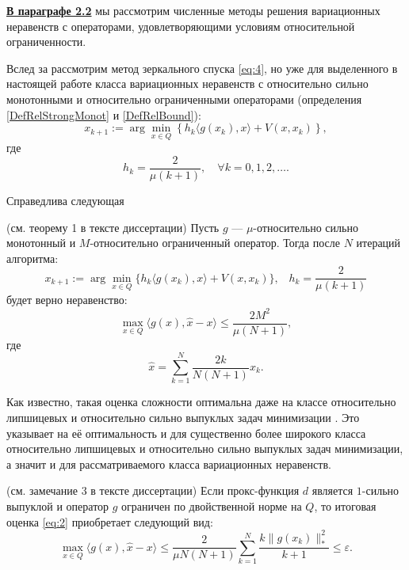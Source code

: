 \underline{\textbf{В параграфе 2.2}} мы рассмотрим численные методы решения вариационных неравенств с операторами, удовлетворяющими условиям относительной ограниченности.

Вслед за \cite{Bach_2012} рассмотрим метод зеркального спуска \eqref{eq:4}, но уже для выделенного в настоящей работе класса  вариационных неравенств с относительно сильно монотонными и относительно ограниченными операторами (определения \ref{DefRelStrongMonot} и \ref{DefRelBound}):
\begin{equation} \label{eq:4}
    x_{k+1} := \arg \min_{x \in Q} \left\{ h_k \langle g(x_k), x \rangle + V(x, x_k)\right\},
\end{equation}
где
$$
    h_k = \frac{2}{\mu(k+1)},\quad  \forall k= 0,1, 2, \ldots.
$$

Справедлива следующая
\begin{theorem}\label{thm_MD_VI} (см. теорему 1 в тексте диссертации)
    Пусть $g$ --- $\mu$-относительно сильно монотонный и $M$-относительно ограниченный оператор. Тогда после $N$ итераций алгоритма: 
    $$ 
        x_{k+1} := \arg \min_{x \in Q} \{ h_k \langle g(x_k), x\rangle + V(x, x_k)\}, \;\;\; h_k = \frac{2}{\mu (k+1)}
    $$
    будет верно неравенство:
    \begin{equation}\label{eq:2}
        \max_{x \in Q} \langle g(x), \widehat{x} - x\rangle \leq \frac{2 M^2}{\mu (N+1)},
    \end{equation}
    где 
    $$
        \widehat{x} = \sum_{k=1}^{N} \frac{2 k}{N (N+1)} x_k.
    $$
\end{theorem}
Как известно, такая оценка сложности оптимальна даже на классе относительно липшицевых и относительно сильно выпуклых задач минимизации \cite{Lu_2018}. Это указывает на её оптимальность и для существенно более широкого класса относительно липшицевых и относительно сильно выпуклых задач минимизации, а значит и для рассматриваемого класса вариационных неравенств. 

\begin{remark} \label{remark4} (см. замечание 3 в тексте диссертации)
    Если прокс-функция $d$ является $1$-сильно выпуклой и оператор $g$ ограничен по двойственной норме на $Q$, то итоговая оценка \eqref{eq:2} приобретает следующий вид:
    \begin{equation}
        \max_{x \in Q} \langle g(x), \widehat{x} - x \rangle \leq \frac{2}{\mu N (N+1)} \sum_{k=1}^{N} \frac{k \|g(x_k)\|_*^2}{k+1} \leq \varepsilon.
    \end{equation}
\end{remark}

